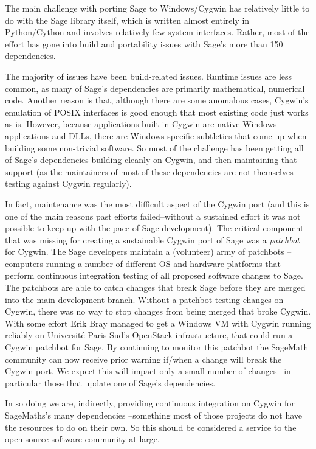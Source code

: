 The main challenge with porting Sage to Windows/Cygwin has relatively
little to do with the Sage library itself, which is written almost
entirely in Python/Cython and involves relatively few system interfaces.
Rather, most of the effort has gone into build and portability issues
with Sage's more than 150 dependencies.

The majority of issues have been build-related issues. Runtime issues
are less common, as many of Sage's dependencies are primarily
mathematical, numerical code. Another reason is that, although there are
some anomalous cases, Cygwin's emulation of POSIX interfaces is good
enough that most existing code just works as-is. However, because
applications built in Cygwin are native Windows applications and DLLs,
there are Windows-specific subtleties that come up when building some
non-trivial software. So most of the challenge has been getting all of
Sage's dependencies building cleanly on Cygwin, and then maintaining
that support (as the maintainers of most of these dependencies are not
themselves testing against Cygwin regularly).

In fact, maintenance was the most difficult aspect of the Cygwin port
(and this is one of the main reasons past efforts failed--without a
sustained effort it was not possible to keep up with the pace of Sage
development). The critical component that was missing for creating a
sustainable Cygwin port of Sage was a \emph{patchbot} for Cygwin. The
Sage developers maintain a (volunteer) army of patchbots --computers
running a number of different OS and hardware platforms that perform
continuous integration testing of all proposed software changes to Sage.
The patchbots are able to catch changes that break Sage before they are
merged into the main development branch. Without a patchbot testing
changes on Cygwin, there was no way to stop changes from being merged
that broke Cygwin. With some effort Erik Bray managed to get a Windows
VM with Cygwin running reliably on Université Paris Sud's OpenStack
infrastructure, that could run a Cygwin patchbot for Sage. By continuing
to monitor this patchbot the SageMath community can now receive prior
warning if/when a change will break the Cygwin port. We expect this will
impact only a small number of changes --in particular those that update
one of Sage's dependencies.

In so doing we are, indirectly, providing continuous integration on
Cygwin for SageMaths's many dependencies --something most of those
projects do not have the resources to do on their own. So this should be
considered a service to the open source software community at large.


